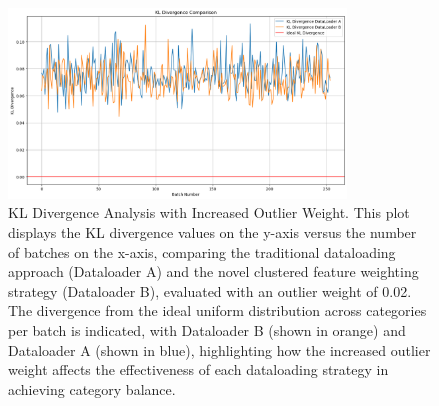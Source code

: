 \begin{figure}[htbp]
\begin{center}
\includegraphics[width=0.8\textwidth]{Images_Thesis/Dataloader_comp/Images_0_02/output_0_02_outlier_weight_KL.png}
\end{center}
\caption[KL divergence analysis with increased outlier weight.]{KL Divergence Analysis with Increased Outlier Weight. This plot displays the KL divergence values on the y-axis versus the number of batches on the x-axis, comparing the traditional dataloading approach (Dataloader A) and the novel clustered feature weighting strategy (Dataloader B), evaluated with an outlier weight of 0.02. The divergence from the ideal uniform distribution across categories per batch is indicated, with Dataloader B (shown in orange) and Dataloader A (shown in blue), highlighting how the increased outlier weight affects the effectiveness of each dataloading strategy in achieving category balance.}
\label{fig:kl_divergence_plot_0_02}
\end{figure}

